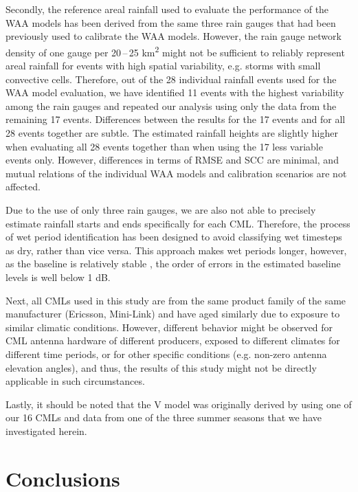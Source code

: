 \documentclass{ctuthesis}\usepackage[]{graphicx}\usepackage[]{color}
\begin{document}
Secondly, the reference areal rainfall used to evaluate the performance of the WAA models has been derived from the same three rain gauges that had been previously used to calibrate the WAA models. However, the rain gauge network density of one gauge per 20\,--\,25 km\textsuperscript{2} might not be sufficient to reliably represent areal rainfall for events with high spatial variability, e.g. storms with small convective cells. Therefore, out of the 28 individual rainfall events used for the WAA model evaluation, we have identified 11 events with the highest variability among the rain gauges and repeated our analysis using only the data from the remaining 17 events. Differences between the results for the 17 events and for all 28 events together are subtle. The estimated rainfall heights are slightly higher when evaluating all 28 events together than when using the 17 less variable events only. However, differences in terms of RMSE and SCC are minimal, and mutual relations of the individual WAA models and calibration scenarios are not affected.

Due to the use of only three rain gauges, we are also not able to precisely estimate rainfall starts and ends specifically for each CML. Therefore, the process of wet period identification has been designed to avoid classifying wet timesteps as dry, rather than vice versa. This approach makes wet periods longer, however, as the baseline is relatively stable \citep{schleissQuantificationModelingWetAntenna2013}, the order of errors in the estimated baseline levels is well below 1 dB.

Next, all CMLs used in this study are from the same product family of the same manufacturer (Ericsson, Mini-Link) and have aged similarly due to exposure to similar climatic conditions. However, different behavior might be observed for CML antenna hardware of different producers, exposed to different climates for different time periods, or for other specific conditions (e.g. non-zero antenna elevation angles), and thus, the results of this study might not be directly applicable in such circumstances.

Lastly, it should be noted that the V model was originally derived \citep{valtrExcessAttenuationCaused2019} by using one of our 16 CMLs and data from one of the three summer seasons that we have investigated herein. 



\section{Conclusions}
\end{document}
